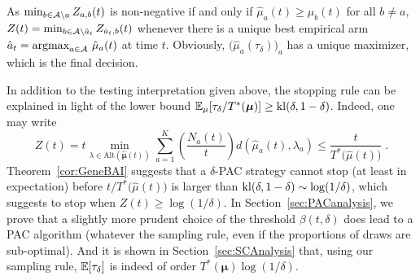 \documentclass{colt2016} %
\begin{document}
As $\min_{b \in \mathcal{A} \setminus a} Z_{a,b}(t)$ is non-negative if and only if $\hat{\mu}_a(t)\geq \hat{\mu}_b(t)$ for all $b\neq a$, $Z(t) = \min_{b \in \mathcal{A} \setminus \hat{a}_t} Z_{\hat{a}_t,b}(t)$ whenever there is a unique  best empirical arm  $\hat{a}_t =  \text{argmax}_{a \in \Arms} \ \hat{\mu}_a(t)$ at time $t$.
 Obviously, $\big(\hat{\mu}_a(\tau_\delta)\big)_a$ has a unique maximizer, which is the final decision.

In addition to the testing interpretation given above, the stopping rule can be explained in light of the lower bound $\mathbb{E}_\mu[\tau_\delta/T^*(\bm\mu)]\geq \mathrm{kl}(\delta,1-\delta)$. Indeed, one may write
\[Z(t) = t \min_{\lambda \in \mathrm{Alt}(\hat{\bm \mu}(t))}\sum_{a=1}^K \left(\frac{N_a(t)}{t}\right)d(\hat{\mu}_a(t),\lambda_a)  \leq \frac{t}{ T^*\big(\hat{\mu}(t)\big)}\;.\]
Theorem~\ref{cor:GeneBAI} suggests that a $\delta$-PAC strategy cannot stop (at least in expectation) before $t/T^*\big(\hat{\mu}(t)\big)$ is larger than $\mathrm{kl}(\delta, 1-\delta)\sim \log(1/\delta)$, which suggests to stop when $Z(t)\geq \log(1/\delta)$. In Section~\ref{sec:PACanalysis}, we prove that a slightly more prudent choice of the threshold $\beta(t,\delta)$ does lead to a PAC algorithm (whatever the sampling rule, even if the proportions of draws are sub-optimal). And it is shown in Section~\ref{sec:SCAnalysis} that, using our sampling rule, $\mathbb{E}[\tau_\delta]$ is indeed of order $T^*(\bm\mu)\log(1/\delta)$.
\end{document}

